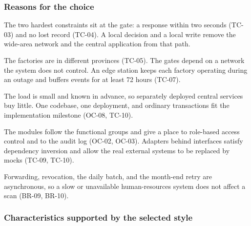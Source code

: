 \subsubsection{Reasons for the choice}

The two hardest constraints sit at the gate: a response within two seconds (TC-03) and no lost record (TC-04).
A local decision and a local write remove the wide-area network and the central application from that path.

The factories are in different provinces (TC-05).
The gates depend on a network the system does not control.
An edge station keeps each factory operating during an outage and buffers events for at least 72 hours (TC-07).

The load is small and known in advance, so separately deployed central services buy little.
One codebase, one deployment, and ordinary transactions fit the implementation milestone (OC-08, TC-10).

The modules follow the functional groups and give a place to role-based access control and to the audit log (OC-02, OC-03).
Adapters behind interfaces satisfy dependency inversion and allow the real external systems to be replaced by mocks (TC-09, TC-10).

Forwarding, revocation, the daily batch, and the month-end retry are asynchronous, so a slow or unavailable human-resources system does not affect a scan (BR-09, BR-10).

\subsubsection{Characteristics supported by the selected style}

